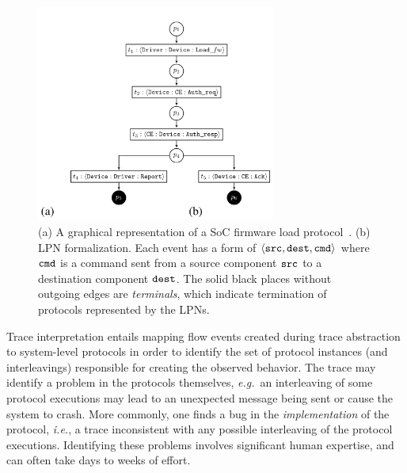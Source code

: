 \documentclass[12pt,frontmatter,copyright,thesis]{usfmanus}
\newcommand{\eg}{\mbox{{\em e.g.}}}
\newcommand{\ie}{\mbox{{\em i.e.}}}
\begin{document}
\begin{figure}
\label{flow-spec-ex}
\centering
    \includegraphics[width=0.7\textwidth]{try}
 \caption{(a) A graphical representation of a SoC firmware
  load protocol~\cite{Krstic14HOST}.  (b) LPN formalization.
  Each event has a form of $\langle {\tt src, dest, cmd}
  \rangle$ where ${\tt cmd}$ is a command sent from a source
  component ${\tt src}$ to a destination component ${\tt
    dest}$. The solid black places without outgoing edges
  are {\em terminals}, which indicate termination of
  protocols represented by the LPNs.}
\end{figure}

Trace interpretation entails mapping flow events created
during trace abstraction to system-level protocols in order
to identify the set of protocol instances (and
interleavings) responsible for creating the observed
behavior.  The trace may identify a problem in the protocols
themselves, \eg~an interleaving of some protocol executions
may lead to an unexpected message being sent or cause the
system to crash.  More commonly, one finds a bug in the {\em
  implementation} of the protocol, \ie, a trace inconsistent
with any possible interleaving of the protocol executions.
Identifying these problems involves significant human
expertise, and can often take days to weeks of effort.
\end{document}
